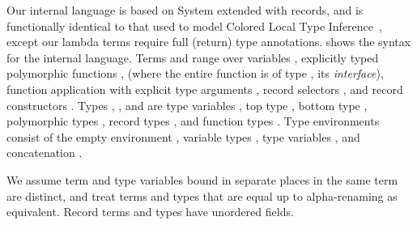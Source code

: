 Our internal language is based on System \ltiFsub extended with records, and is functionally identical
to that used to model Colored Local Type Inference~\cite{coloredlti01}, except
our lambda terms require full (return) type annotations.
 shows the syntax
for the internal language.
Terms \ltiE{} and \ltiF{} range over 
variables \ltivar{},
explicitly typed polymorphic functions
                         \ltifuntparaminterface{\ova{\ltitvar{}}}
                                               {\ltiFn{\ltiT{}}{\ltiS{}}}
                                               {\ltivar{}}
                                               {\ltiE{}},
(where the entire function is of type \ltiPoly{\ova{\ltitvar{}}}{\ltiFn{\ltiT{}}{\ltiS{}}}, its \emph{interface}),
function application
with explicit type arguments
\ltiappinst{\ltiF{}}{\ova{\ltiR{}}}{\ltiE{}},
record selectors
\ltisel{\ltiE{}}{\ltivar{}},
and record constructors
\ltiRec{\ova{\ltivar{} = \ltiE{}}}.
Types \ltiT{}, \ltiS{}, and \ltiR{} are 
type variables \ltitvar{},
top type \ltiTop,
bottom type \ltiBot,
polymorphic types \ltiPoly{\ova{\ltitvar{}}}{\ltiT{}},
record types \ltiRec{\ova{\hastype{\ltivar{}}{\ltiT{}}}},
and function types
\ltiFn{\ltiT{}}{\ltiS{}}.
Type environments \ltiEnv{}
consist of 
the empty environment
\ltiEmptyEnv,
variable types
\hastype{\ltivar{}}{\ltiT{}},
type variables 
\ltitvar{},
and concatenation
\ltiEnvConcat{\ltiEnv{}}{\ltiEnvp{}}.

We assume term and type variables bound in separate places in the same term are distinct,
and treat terms and types that are equal up to alpha-renaming as equivalent.
Record terms and types have unordered fields.

